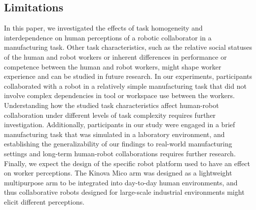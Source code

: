 \subsection{Limitations}
In this paper, we investigated the effects of task homogeneity and interdependence on human perceptions of a robotic collaborator in a manufacturing task. Other task characteristics, such as the relative social statuses of the human and robot workers or inherent differences in performance or competence between the human and robot workers, might shape worker experience and can be studied in future research. In our experiments, participants collaborated with a robot in a relatively simple manufacturing task that did not involve complex dependencies in tool or workspace use between the workers. Understanding how the studied task characteristics affect human-robot collaboration under different levels of task complexity requires further investigation. Additionally, participants in our study were engaged in a brief manufacturing task that was simulated in a laboratory environment, and establishing the generalizability of our findings to real-world manufacturing settings and long-term human-robot collaborations requires further research. Finally, we expect the design of the specific robot platform used to have an effect on worker perceptions. The Kinova Mico arm was designed as a lightweight multipurpose arm to be integrated into day-to-day human environments, and thus collaborative robots designed for large-scale industrial environments might elicit different perceptions.
